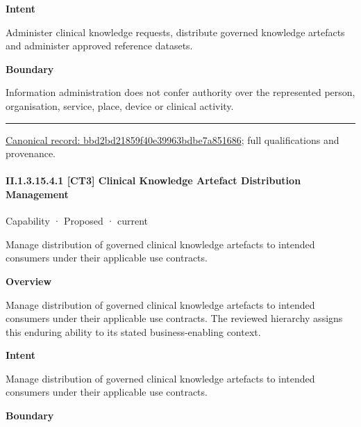 \textbf{Intent}



Administer clinical knowledge requests, distribute governed knowledge artefacts and administer approved reference datasets.



\textbf{Boundary}



Information administration does not confer authority over the represented person, organisation, service, place, device or clinical activity.



\medskip\hrule\medskip

{\footnotesize \href{../../../../continuum/strategy/capability/bbd2bd21859f40e39963bdbe7a851686.md}{Canonical record: bbd2bd21859f40e39963bdbe7a851686}; full qualifications and provenance.}\par
\paragraph*{II.1.3.15.4.1 [CT3] Clinical Knowledge Artefact Distribution Management}
\label{navigation:II.1.3.15.4.1}

\label{element:cd29a9eb798949bc8bc81bb5d434cabf}
{\small Capability · Proposed · current}\par

Manage distribution of governed clinical knowledge artefacts to intended consumers under their applicable use contracts.



\textbf{Overview}



Manage distribution of governed clinical knowledge artefacts to intended consumers under their applicable use contracts. The reviewed hierarchy assigns this enduring ability to its stated business-enabling context.



\textbf{Intent}



Manage distribution of governed clinical knowledge artefacts to intended consumers under their applicable use contracts.



\textbf{Boundary}



